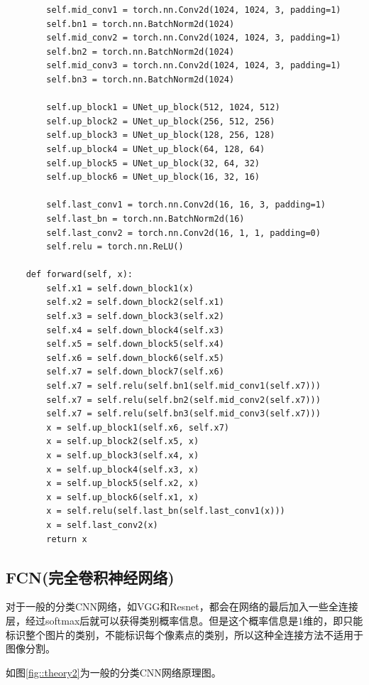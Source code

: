 \begin{lstlisting}
        self.mid_conv1 = torch.nn.Conv2d(1024, 1024, 3, padding=1)
        self.bn1 = torch.nn.BatchNorm2d(1024)
        self.mid_conv2 = torch.nn.Conv2d(1024, 1024, 3, padding=1)
        self.bn2 = torch.nn.BatchNorm2d(1024)
        self.mid_conv3 = torch.nn.Conv2d(1024, 1024, 3, padding=1)
        self.bn3 = torch.nn.BatchNorm2d(1024)

        self.up_block1 = UNet_up_block(512, 1024, 512)
        self.up_block2 = UNet_up_block(256, 512, 256)
        self.up_block3 = UNet_up_block(128, 256, 128)
        self.up_block4 = UNet_up_block(64, 128, 64)
        self.up_block5 = UNet_up_block(32, 64, 32)
        self.up_block6 = UNet_up_block(16, 32, 16)

        self.last_conv1 = torch.nn.Conv2d(16, 16, 3, padding=1)
        self.last_bn = torch.nn.BatchNorm2d(16)
        self.last_conv2 = torch.nn.Conv2d(16, 1, 1, padding=0)
        self.relu = torch.nn.ReLU()

    def forward(self, x):
        self.x1 = self.down_block1(x)
        self.x2 = self.down_block2(self.x1)
        self.x3 = self.down_block3(self.x2)
        self.x4 = self.down_block4(self.x3)
        self.x5 = self.down_block5(self.x4)
        self.x6 = self.down_block6(self.x5)
        self.x7 = self.down_block7(self.x6)
        self.x7 = self.relu(self.bn1(self.mid_conv1(self.x7)))
        self.x7 = self.relu(self.bn2(self.mid_conv2(self.x7)))
        self.x7 = self.relu(self.bn3(self.mid_conv3(self.x7)))
        x = self.up_block1(self.x6, self.x7)
        x = self.up_block2(self.x5, x)
        x = self.up_block3(self.x4, x)
        x = self.up_block4(self.x3, x)
        x = self.up_block5(self.x2, x)
        x = self.up_block6(self.x1, x)
        x = self.relu(self.last_bn(self.last_conv1(x)))
        x = self.last_conv2(x)
        return x
\end{lstlisting}

\subsection{FCN(完全卷积神经网络)}\label{fcnux5b8cux5168ux5377ux79efux795eux7ecfux7f51ux7edc}

对于一般的分类CNN网络，如VGG和Resnet，都会在网络的最后加入一些全连接层，经过softmax后就可以获得类别概率信息。但是这个概率信息是1维的，即只能标识整个图片的类别，不能标识每个像素点的类别，所以这种全连接方法不适用于图像分割。

如图\ref{fig::theory2}为一般的分类CNN网络原理图。

